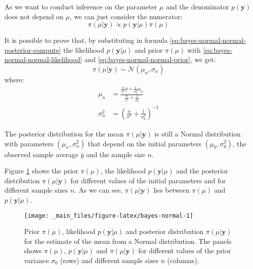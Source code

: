 \documentclass[a4paper, twoside, openright, 12pt]{report}
\theoremstyle{definition}
\theoremstyle{definition}
\theoremstyle{definition}
\theoremstyle{remark}
\begin{document}
As we want to conduct inference on the parameter \(\mu\) and the denominator \(p(\boldsymbol{y})\) does not depend on \(\mu\), we can just consider the numerator:
\begin{equation}
\label{eq:bayes-normal-normal-posterior-compute}
\pi(\mu|\boldsymbol{y}) \propto p(\boldsymbol{y}|\mu)\pi(\mu)
\end{equation}

It is possible to prove that, by substituting in formula \eqref{eq:bayes-normal-normal-posterior-compute} the likelihood \(p(\boldsymbol{y}|\mu)\) and prior \(\pi(\mu)\) with \eqref{eq:bayes-normal-normal-likelihood} and \eqref{eq:bayes-normal-normal-prior}, we get:
\begin{equation}
\label{eq:bayes-normal-normal-posterior-result}
\pi(\mu|\boldsymbol{y}) \sim \mathcal{N}\left(  \mu_n, \sigma_n \right)
\end{equation}
where:
\begin{align}
\label{eq:bayes-normal-normal-mu}
\mu_n & = \frac{\frac{n}{\sigma^2}\bar{y} + \frac{1}{\sigma_0^2}\mu_0}{ \frac{n}{\sigma^2} + \frac{1}{\sigma_0^2}} \\
\label{eq:bayes-normal-normal-sigma}
\sigma_n^2 & = \left( \frac{n}{\sigma^2} + \frac{1}{\sigma_0^2} \right)^{-1}
\end{align}

The posterior distribution for the mean \(\pi(\mu|\boldsymbol{y})\) is still a Normal distribution with parameters \((\mu_n, \sigma_n^2)\) that depend on the initial parameters \((\mu_0, \sigma_0^2)\), the observed sample average \(\bar{y}\) and the sample size \(n\).

Figure \ref{fig:bayes-normal} shows the prior \(\pi(\mu)\), the likelihood \(p(\boldsymbol{y}|\mu)\) and the posterior distribution \(\pi(\mu|\boldsymbol{y})\) for different values of the initial parameters and for different sample sizes \(n\). As we can see, \(\pi(\mu|\boldsymbol{y})\) lies between \(\pi(\mu)\) and \(p(\boldsymbol{y}|\mu)\).





\begin{figure}[!hbtp]

{\centering \texttt{[image: \_main\_files/figure-latex/bayes-normal-1]} 

}

\caption[Prior \(\pi(\mu)\), likelihood \(p(\boldsymbol{y}|\mu)\) and posterior distribution \(\pi(\mu|\boldsymbol{y})\) for the estimate of the mean from a Normal distribution.]{Prior \(\pi(\mu)\), likelihood \(p(\boldsymbol{y}|\mu)\) and posterior distribution \(\pi(\mu|\boldsymbol{y})\) for the estimate of the mean from a Normal distribution. The panels shows \(\pi(\mu)\), \(p(\boldsymbol{y}|\mu)\) and \(\pi(\mu|\boldsymbol{y})\) for different values of the prior variance \(\sigma_0\) (rows) and different sample sizes \(n\) (columns).}\label{fig:bayes-normal}
\end{figure}
\end{document}
